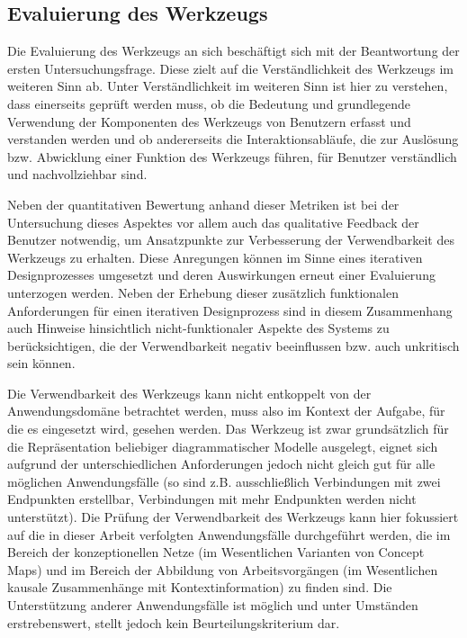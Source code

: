 \subsection{Evaluierung des Werkzeugs}
\label{sub:eval_werkzeug}

Die Evaluierung des Werkzeugs an sich beschäftigt sich mit der Beantwortung der ersten Untersuchungsfrage. Diese zielt auf die Verständlichkeit des Werkzeugs im weiteren Sinn ab. Unter Verständlichkeit im weiteren Sinn ist hier zu verstehen, dass einerseits geprüft werden muss, ob die Bedeutung und grundlegende Verwendung der Komponenten des Werkzeugs von Benutzern erfasst und verstanden werden und ob andererseits die Interaktionsabläufe, die zur Auslösung bzw. Abwicklung einer Funktion des Werkzeugs führen, für Benutzer verständlich und nachvollziehbar sind.

Neben der quantitativen Bewertung anhand dieser Metriken ist bei der Untersuchung dieses Aspektes vor allem auch das qualitative Feedback der Benutzer notwendig, um Ansatzpunkte zur Verbesserung der Verwendbarkeit des Werkzeugs zu erhalten. Diese Anregungen können im Sinne eines iterativen Designprozesses umgesetzt und deren Auswirkungen erneut einer Evaluierung unterzogen werden. Neben der Erhebung dieser zusätzlich funktionalen Anforderungen für einen iterativen Designprozess sind in diesem Zusammenhang auch Hinweise hinsichtlich nicht-funktionaler Aspekte des Systems zu berücksichtigen, die der Verwendbarkeit negativ beeinflussen bzw. auch unkritisch sein können.

Die Verwendbarkeit des Werkzeugs kann nicht entkoppelt von der Anwendungsdomäne betrachtet werden, muss also im Kontext der Aufgabe, für die es eingesetzt wird, gesehen werden. Das Werkzeug ist zwar grundsätzlich für die Repräsentation beliebiger diagrammatischer Modelle ausgelegt, eignet sich aufgrund der unterschiedlichen Anforderungen jedoch nicht gleich gut für alle möglichen Anwendungsfälle (so sind z.B. ausschließlich Verbindungen mit zwei Endpunkten erstellbar, Verbindungen mit mehr Endpunkten werden nicht unterstützt). Die Prüfung der Verwendbarkeit des Werkzeugs kann hier fokussiert auf die in dieser Arbeit verfolgten Anwendungsfälle durchgeführt werden, die im Bereich der konzeptionellen Netze (im Wesentlichen Varianten von Concept Maps) und im Bereich der Abbildung von Arbeitsvorgängen (im Wesentlichen kausale Zusammenhänge mit Kontextinformation) zu finden sind. Die Unterstützung anderer Anwendungsfälle ist möglich und unter Umständen erstrebenswert, stellt jedoch kein Beurteilungskriterium dar.

